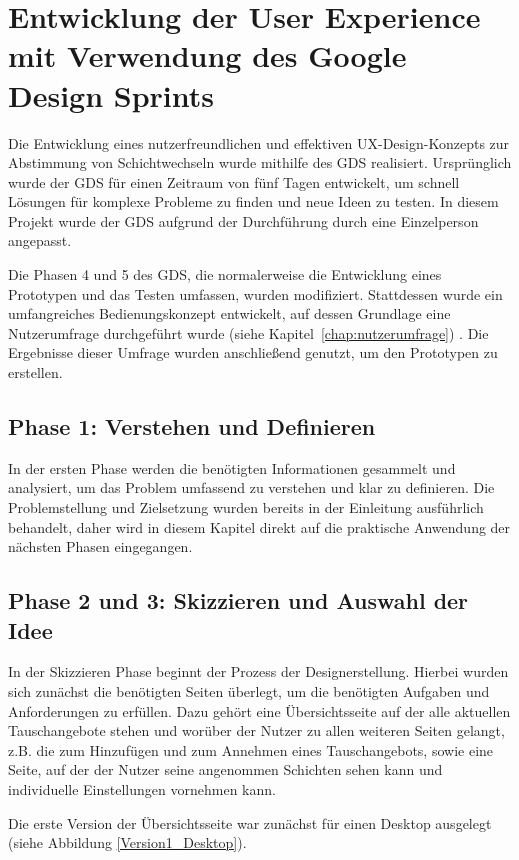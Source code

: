 \chapter{Entwicklung der User Experience mit Verwendung des Google Design Sprints}

Die Entwicklung eines nutzerfreundlichen und effektiven UX-Design-Konzepts zur Abstimmung von Schichtwechseln wurde mithilfe des GDS realisiert. Ursprünglich wurde der GDS für einen Zeitraum von fünf Tagen entwickelt, um schnell Lösungen für komplexe Probleme zu finden und neue Ideen zu testen. In diesem Projekt wurde der GDS aufgrund der Durchführung durch eine Einzelperson angepasst.

Die Phasen 4 und 5 des GDS, die normalerweise die Entwicklung eines Prototypen und das Testen umfassen, wurden modifiziert. Stattdessen wurde ein umfangreiches Bedienungskonzept entwickelt, auf dessen Grundlage eine Nutzerumfrage durchgeführt wurde (siehe Kapitel~\ref{chap:nutzerumfrage}) .
Die Ergebnisse dieser Umfrage wurden anschließend genutzt, um den Prototypen zu erstellen.

\section{Phase 1: Verstehen und Definieren}
In der ersten Phase werden die benötigten Informationen gesammelt und analysiert, um das Problem umfassend zu verstehen und klar zu definieren. Die Problemstellung und Zielsetzung wurden bereits in der Einleitung ausführlich behandelt, daher wird in diesem Kapitel direkt auf die praktische Anwendung der nächsten Phasen eingegangen.

\section{Phase 2 und 3: Skizzieren und Auswahl der Idee}
In der Skizzieren Phase beginnt der Prozess der Designerstellung. Hierbei wurden sich zunächst die benötigten Seiten überlegt, um die benötigten Aufgaben und Anforderungen zu erfüllen. Dazu gehört eine Übersichtsseite auf der alle aktuellen Tauschangebote stehen und worüber der Nutzer zu allen weiteren Seiten gelangt, z.B. die zum Hinzufügen und zum Annehmen eines Tauschangebots, sowie eine Seite, auf der der Nutzer seine angenommen Schichten sehen kann und individuelle Einstellungen vornehmen kann. 

Die erste Version der Übersichtsseite war zunächst für einen Desktop ausgelegt (siehe Abbildung \ref{Version1_Desktop}). 

